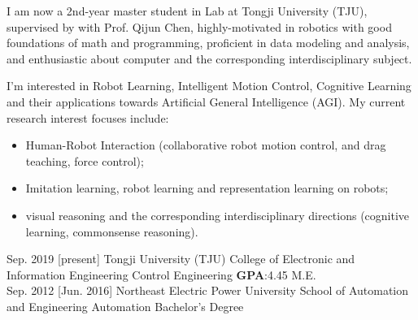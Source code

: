 \documentclass{resume}
\begin{document}
\makeheader

I am now a 2nd-year master student in  Lab at Tongji University (TJU), supervised by with Prof.  {Qijun Chen}, highly-motivated in robotics with good foundations of math and programming, proficient in data modeling and analysis, and enthusiastic about computer and the corresponding interdisciplinary subject.

I'm interested in Robot Learning, Intelligent Motion Control, Cognitive Learning and their applications towards Artificial General Intelligence (AGI). My current research interest focuses include:
\begin{itemize}
  \item Human-Robot Interaction (collaborative robot motion control, and drag teaching, force control);
  \item Imitation learning, robot learning and representation learning on robots;
  \item visual reasoning and the corresponding interdisciplinary directions (cognitive learning, commonsense reasoning).\\
\end{itemize}

\begin{educations}
  \education%
    {Sep. 2019}%
    [present]%
    {Tongji University (TJU)}%
    {College of Electronic and Information Engineering}%
    {Control Engineering   \quad \textbf{GPA}:4.45}%
    {M.E.}\\

  \separator{0.5ex}
  \education%
    {Sep. 2012}%
    [Jun. 2016]%
    {Northeast Electric Power University}%
    {School of Automation and Engineering}%
    {Automation}%
    {Bachelor's Degree}
    
\end{educations}
\end{document}
